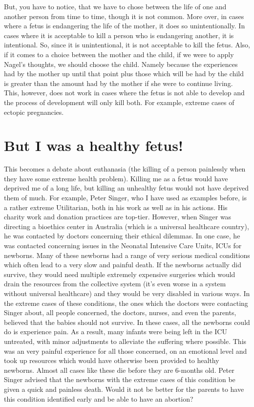 But, you have to notice, that we have to chose between the life of one and another person from time to time, though it is not common. More over, in cases where a fetus is endangering the life of the mother, it does so unintentionally. In cases where it is acceptable to kill a person who is endangering another, it is intentional. So, since it is unintentional, it is not acceptable to kill the fetus. Also, if it comes to a choice between the mother and the child, if we were to apply Nagel’s thoughts, we should choose the child. Namely because the experiences had by the mother up until that point plus those which will be had by the child is greater than the amount had by the mother if she were to continue living. This, however, does not work in cases where the fetus is not able to develop and the process of development will only kill both. For example, extreme cases of ectopic pregnancies. 
\section{But I was a healthy fetus!}

This becomes a debate about euthanasia (the killing of a person painlessly when they have some extreme health problem). Killing me as a fetus would have deprived me of a long life, but killing an unhealthy fetus would not have deprived them of much. For example, Peter Singer, who I have used as examples before, is a rather extreme Utilitarian, both in his work as well as in his actions. His charity work and donation practices are top-tier. However, when Singer was directing a bioethics center in Australia (which is a universal healthcare country), he was contacted by doctors concerning their ethical dilemmas. In one case, he was contacted concerning issues in the Neonatal Intensive Care Units, ICUs for newborns.  Many of these newborns had a range of very serious medical conditions which often lead to a very slow and painful death. If the newborns actually did survive, they would need multiple extremely expensive surgeries which would drain the resources from the collective system (it's even worse in a system without universal healthcare) and they would be very disabled in various ways. In the extreme cases of these conditions, the ones which the doctors were contacting Singer about, all people concerned, the  doctors, nurses, and even the parents, believed that the babies should not survive. In these cases, all the newborns could do is experience pain. As a result, many infants were being left in the ICU untreated, with minor adjustments to alleviate the suffering where possible.  This was an very painful experience for all those concerned, on an emotional level and took up resources which would have otherwise been provided to healthy newborns. Almost all cases like these die before they are 6-months old.  Peter Singer advised that the newborns with the extreme cases of this condition be given a quick and painless death. Would it not be better for the parents to have this condition identified early and be able to have an abortion?  
